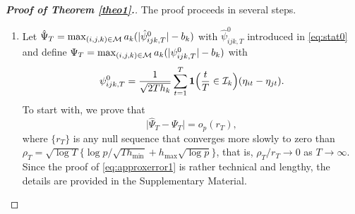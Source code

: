 \documentclass[a4paper,12pt]{article}
\numberwithin{equation}{section}
\begin{document}
\begin{proof}[\textnormal{\textbf{Proof of Theorem \ref{theo1}.}}] The proof proceeds in several steps. 
\begin{enumerate}[label=\textit{Step \arabic*.}, leftmargin=0cm, itemindent=1.45cm]


\item %
Let $\hat{\Psi}_T = \max_{(i,j,k) \in \mathcal{M}} a_k (|\hat{\psi}_{ijk,T}^0| - b_k)$ with $\hat{\psi}_{ijk,T}^0$ introduced in \eqref{eq:stat0}
and define $\Psi_T = \max_{(i,j,k) \in \mathcal{M}} a_k (|\psi_{ijk,T}^0| - b_k)$ with 
\[ \psi_{ijk,T}^0 = \frac{1}{\sqrt{2Th_k}} \sum\limits_{t=1}^T \boldsymbol{1}\Big(\frac{t}{T} \in \mathcal{I}_k\Big) (\eta_{it} - \eta_{jt}). \]
To start with, we prove that  
\begin{equation}\label{eq:approxerror1}
\big| \hat{\Psi}_T - \Psi_T \big| = o_p(r_T),
\end{equation}
where $\{r_T\}$ is any null sequence that converges more slowly to zero than $\rho_T = \sqrt{\log T} \{ \log p/\sqrt{Th_{\min}} + h_{\max} \sqrt{\log p} \}$, that is, $\rho_T/r_T \rightarrow 0$ as $T \rightarrow \infty$. Since the proof of \eqref{eq:approxerror1} is rather technical and lengthy, the details are provided in the Supplementary Material. 



\end{enumerate}
\end{proof}
\end{document}
